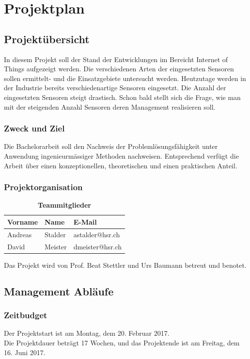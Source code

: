 \chapter{Projektplan}
\section{Projektübersicht}
In diesem Projekt soll der Stand der Entwicklungen im Bereicht \glqq Internet of Things\grqq{} aufgezeigt werden. Die verschiedenen Arten der eingesetzten Sensoren sollen ermittelt- und die Einsatzgebiete untersucht werden. Heutzutage werden in der Industrie bereits verschiedenartige Sensoren eingesetzt. Die Anzahl der eingesetzten Sensoren steigt drastisch. Schon bald stellt sich die Frage, wie man mit der steigenden Anzahl Sensoren deren Management realisieren soll.
\subsection{Zweck und Ziel}
Die Bachelorarbeit soll den Nachweis der Problemlösungsfähigkeit unter Anwendung
ingenieurmässiger Methoden nachweisen. Entsprechend verfügt die Arbeit über einen
konzeptionellen, theoretischen und einen praktischen Anteil.
\subsection{Projektorganisation}
\begin{table}[H]
\centering
    \begin{tabular}{@{} l l l@{}}    
    {Vorname} & {Name} & {E-Mail} \\ \midrule
    Andreas & Stalder & astalder@hsr.ch \\ \addlinespace
    David & Meister & dmeister@hsr.ch \\ \bottomrule
    \end{tabular}
\caption{\textbf{Teammitglieder}}
\end{table} 

Das Projekt wird von Prof. Beat Stettler und Urs Baumann betreut und benotet.
\section{Management Abläufe}
\subsection{Zeitbudget}
Der Projektstart ist am Montag, dem 20. Februar 2017. \\
Die Projektdauer beträgt 17 Wochen, und das Projektende ist am Freitag, dem 16. Juni 2017. \\

